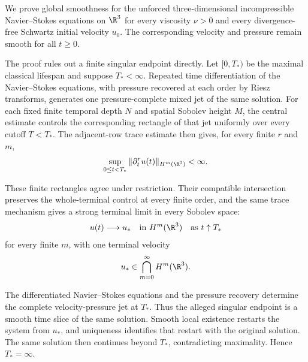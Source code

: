 
We prove global smoothness for the unforced three-dimensional incompressible Navier--Stokes equations on \(\R^3\) for every viscosity \(\nu>0\) and every divergence-free Schwartz initial velocity \(u_0\).
The corresponding velocity and pressure remain smooth for all \(t\geq 0\).

The proof rules out a finite singular endpoint directly.
Let \([0,T_*)\) be the maximal classical lifespan and suppose \(T_*<\infty\).
Repeated time differentiation of the Navier--Stokes equations, with pressure recovered at each order by Riesz transforms, generates one pressure-complete mixed jet of the same solution.
For each fixed finite temporal depth \(N\) and spatial Sobolev height \(M\), the central estimate controls the corresponding rectangle of that jet uniformly over every cutoff \(T<T_*\).
The adjacent-row trace estimate then gives, for every finite \(r\) and \(m\),
\[
\sup_{0\leq t<T_*}
\|\partial_t^r u(t)\|_{H^m(\R^3)}
<\infty.
\]

These finite rectangles agree under restriction.
Their compatible intersection preserves the whole-terminal control at every finite order, and the same trace mechanism gives a strong terminal limit in every Sobolev space:
\[
u(t)\longrightarrow u_*
\quad\text{in }H^m(\R^3)
\quad\text{as }t\uparrow T_*
\]
for every finite \(m\), with one terminal velocity
\[
u_*\in\bigcap_{m=0}^{\infty}H^m(\R^3).
\]

The differentiated Navier--Stokes equations and the pressure recovery determine the complete velocity-pressure jet at \(T_*\).
Thus the alleged singular endpoint is a smooth time slice of the same solution.
Smooth local existence restarts the system from \(u_*\), and uniqueness identifies that restart with the original solution.
The same solution then continues beyond \(T_*\), contradicting maximality.
Hence \(T_*=\infty\).
